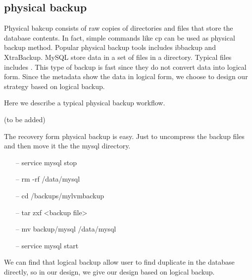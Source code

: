 \subsection{physical backup}

Physical bakcup consists of raw copies of directories and files that store the database contents\citep{mysqlbackupdocumentation}. In fact, simple commands like cp can be used as physical backup method. Popular physical backup tools includes ibbackup and XtraBackup\citep{xtrabackup}. MySQL store data in a set of files in a directory. Typical files includes .
This type of backup is fast since they do not convert data into logical form. Since the metadata show the data in logical form, we choose to design our strategy based on logical backup. 


Here we describe a typical physical backup workflow. 

(to be added)

The recovery form physical backup is easy. Just to uncompress the backup files and then move it the the mysql directory. 


\begin{itemize}
\item[--] service mysql stop
\item[--] rm -rf /data/mysql
\item[--] cd /backups/mylvmbackup
\item[--] tar zxf <backup file>
\item[--] mv backup/mysql /data/mysql
\item[--] service mysql start
\end{itemize}


We can find that logical backup allow user to find duplicate in the database directly, so in our design, we give our design based on logical backup.

